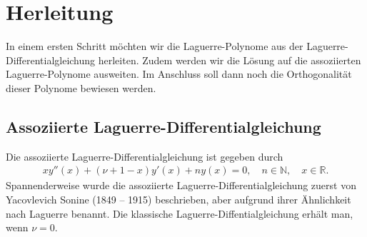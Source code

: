 %
%
%
\section{Herleitung%
  \label{laguerre:section:definition}}
%
In einem ersten Schritt möchten wir die Laguerre-Polynome
aus der Laguerre-\-Differentialgleichung herleiten.
Zudem werden wir die Lösung auf die assoziierten Laguerre-Polynome ausweiten.
Im Anschluss soll dann noch die Orthogonalität dieser Polynome bewiesen werden.

\subsection{Assoziierte Laguerre-Differentialgleichung}
Die assoziierte Laguerre-Differentialgleichung ist gegeben durch
\begin{align}
x y''(x) + (\nu + 1 - x) y'(x) + n y(x)
=
0
, \quad
n \in \mathbb{N}
, \quad
x \in \mathbb{R}
\label{laguerre:dgl}
.
\end{align}
Spannenderweise wurde die assoziierte Laguerre-Differentialgleichung
%
%
zuerst von Yacovlevich Sonine (1849 -- 1915) beschrieben,
%
%
aber aufgrund ihrer Ähnlichkeit nach Laguerre benannt.
Die klassische Laguerre-Diffentialgleichung erhält man, wenn $\nu = 0$.

